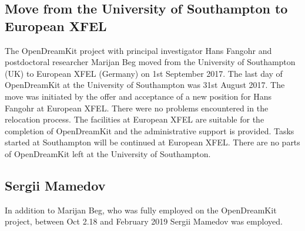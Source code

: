 \documentclass{deliverablereport}
\begin{document}
\subsection{Move from the University of Southampton to European XFEL}

The OpenDreamKit project with principal investigator Hans Fangohr and
postdoctoral researcher Marijan Beg moved from the University of
Southampton (UK) to European XFEL (Germany) on 1st September 2017. The
last day of OpenDreamKit at the University of Southampton was 31st
August 2017. The move was initiated by the offer and acceptance of a
new position for Hans Fangohr at European XFEL. There were no problems
encountered in the relocation process. The facilities at European XFEL
are suitable for the completion of OpenDreamKit and the administrative
support is provided. Tasks started at Southampton will be continued at
European XFEL. There are no parts of OpenDreamKit left at the
University of Southampton.

\subsection{Sergii Mamedov}

In addition to Marijan Beg, who was fully employed on the OpenDreamKit
project, between Oct 2.18 and February 2019 Sergii Mamedov was
employed.

\end{document}
